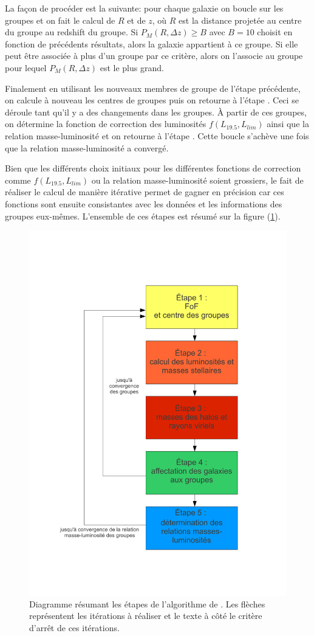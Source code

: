\noindent{}La façon de procéder est la suivante: pour chaque galaxie on boucle sur les groupes et on fait le calcul de $R$ et de
$z$, où $R$ est la distance projetée au centre du groupe au redshift du groupe. Si $P_M(R,\Delta{z})\geq{B}$ avec $B=\num{10}$
choisit en fonction de précédents résultats, alors la galaxie appartient à ce groupe. Si elle peut être associée à plus d'un groupe
par ce critère, alors on l'associe au groupe pour lequel $P_M(R,\Delta{z})$ est le plus grand.

\noindent{} Finalement en utilisant les nouveaux membres de groupe de l'étape précédente, on calcule à nouveau les centres
de groupes puis on retourne à l'étape . Ceci se déroule tant qu'il y a des changements dans les groupes. \`A partir de ces
groupes, on détermine la fonction de correction des luminosités $f(L_{\num{19,5}},L_{lim})$ ainsi que la relation masse-luminosité
et on retourne à l'étape . Cette boucle s'achève une fois que la relation masse-luminosité a convergé.

Bien que les différents choix initiaux pour les différentes fonctions de correction comme $f(L_{\num{19,5}},L_{lim})$ ou la
relation masse-luminosité soient grossiers, le fait de réaliser le calcul de manière itérative permet de gagner en précision car
ces fonctions sont ensuite consistantes avec les données et les informations des groupes eux-mêmes. L'ensemble de ces étapes est résumé
sur la figure (\ref{fig:diag}).

\begin{figure}[htb]
	\centering
	\includegraphics[width=0.5\linewidth]{org}
	\caption{\footnotesize{}Diagramme résumant les étapes de l'algorithme de \citet{Yang+07}. Les flèches représentent les
	itérations à réaliser et le texte à côté le critère d'arrêt de ces itérations.}
	\label{fig:diag}
\end{figure}

